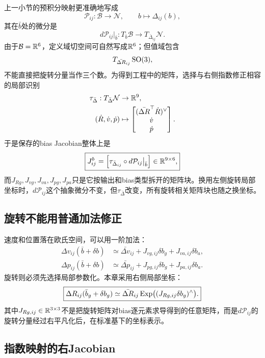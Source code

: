 上一小节的预积分映射更准确地写成
\[
    \mathcal P_{ij}:\mathcal B\to\mathcal N,
    \qquad
    b\longmapsto\Delta_{ij}(b),
\]
其在$\bar b$处的微分是
\[
\boxed{
    d\mathcal P_{ij}\big|_{\bar b}:
    T_{\bar b}\mathcal B
    \longrightarrow
    T_{\bar\Delta_{ij}}\mathcal N.
}
\]
由于$\mathcal B=\mathbb{R}^6$，定义域切空间可自然写成$\mathbb{R}^6$；但值域包含
\[
    T_{\bar{\Delta R}_{ij}}\operatorname{SO}(3),
\]
不能直接把旋转分量当作三个数。为得到工程中的矩阵，选择与右侧指数修正相容的局部识别
\[
\begin{aligned}
    \tau_{\bar\Delta}:T_{\bar\Delta}\mathcal N
    &\to\mathbb{R}^9,\\
    (\dot R,\dot v,\dot p)
    &\mapsto
    \begin{bmatrix}
      (\bar{\Delta R}^{\top}\dot R)^\vee\\
      \dot v\\
      \dot p
    \end{bmatrix}.
\end{aligned}
\]
于是保存的bias Jacobian整体上是
\[
\boxed{
    J_{ij}^{b}
    =\left[
      \tau_{\bar\Delta_{ij}}
      \circ d\mathcal P_{ij}\big|_{\bar b}
    \right]
    \in\mathbb{R}^{9\times6},
}
\]
而$J_{R g},J_{v g},J_{v a},J_{p g},J_{p a}$只是它按输出和bias类型拆开的矩阵块。换用左侧旋转局部坐标时，$d\mathcal P_{ij}$这个抽象微分不变，但$\tau_{\bar\Delta}$改变，所有旋转相关矩阵块也随之换坐标。

\subsection{旋转不能用普通加法修正}

速度和位置落在欧氏空间，可以用一阶加法：
\[
\begin{aligned}
    \Delta v_{ij}(\bar b+\delta b)
    &\simeq
    \bar{\Delta v}_{ij}
    +J_{v g,ij}\delta b_g
    +J_{v a,ij}\delta b_a,\\
    \Delta p_{ij}(\bar b+\delta b)
    &\simeq
    \bar{\Delta p}_{ij}
    +J_{p g,ij}\delta b_g
    +J_{p a,ij}\delta b_a.
\end{aligned}
\]
旋转则必须先选择局部参数化。本章采用右侧局部坐标：
\[
\boxed{
    \Delta R_{ij}(\bar b_g+\delta b_g)
    \simeq
    \bar{\Delta R}_{ij}
    \operatorname{Exp}\bigl((J_{R g,ij}\delta b_g)^\wedge\bigr).
}
\]
其中$J_{R g,ij}\in\mathbb{R}^{3\times3}$不是把旋转矩阵对bias逐元素求导得到的任意矩阵，而是$d\mathcal P_{ij}$的旋转分量经过右平凡化后，在标准基下的坐标表示。

\subsection{指数映射的右Jacobian}

